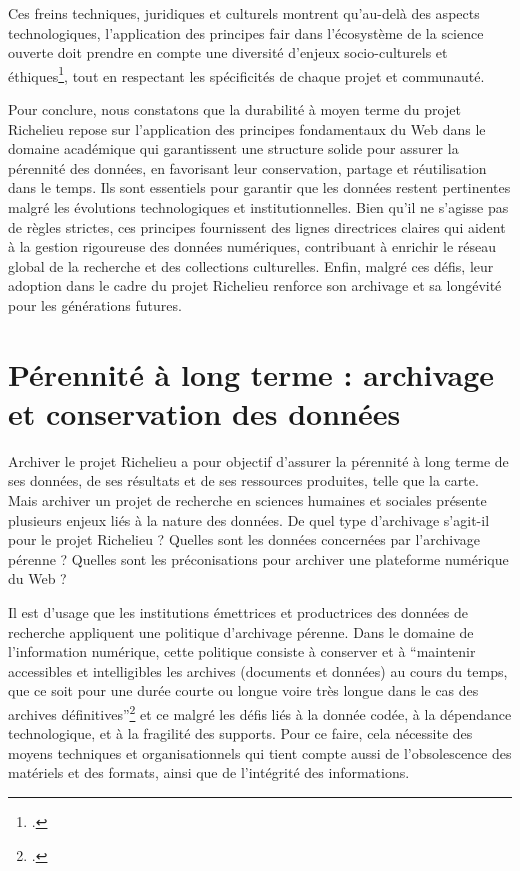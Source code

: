Ces freins techniques, juridiques et culturels montrent qu’au-delà des aspects technologiques, l’application des principes  \acrshort{fair} dans l'écosystème de la science ouverte doit prendre en compte une diversité d’enjeux socio-culturels et éthiques\footcite{WILKINSONInteroperability2017}, tout en respectant les spécificités de chaque projet et communauté.

Pour conclure, nous constatons que la durabilité à moyen terme du projet Richelieu repose sur l’application des principes fondamentaux du Web dans le domaine académique qui garantissent une structure solide pour assurer la pérennité des données, en favorisant leur conservation, partage et réutilisation dans le temps. Ils sont essentiels pour garantir que les données restent pertinentes malgré les évolutions technologiques et institutionnelles. Bien qu'il ne s'agisse pas de règles strictes, ces principes fournissent des lignes directrices claires qui aident à la gestion rigoureuse des données numériques, contribuant à enrichir le réseau global de la recherche et des collections culturelles.  Enfin, malgré ces défis, leur adoption dans le cadre du projet Richelieu renforce son archivage et sa longévité pour les générations futures.

\section{Pérennité à long terme : archivage et conservation des données}
Archiver le projet Richelieu a pour objectif d'assurer la pérennité à long terme de ses données, de ses résultats et de ses ressources produites, telle que la carte.  Mais archiver un projet de recherche en sciences humaines et sociales présente plusieurs enjeux liés à la nature des données. De quel type d'archivage s'agit-il pour le projet Richelieu ? Quelles sont les données concernées par l'archivage pérenne ? Quelles sont les préconisations pour archiver une plateforme numérique du Web ? 

Il est d'usage que les institutions émettrices et productrices des données de recherche appliquent une politique d'archivage pérenne. Dans le domaine de l'information numérique, cette politique consiste à conserver et à \enquote{maintenir accessibles et intelligibles les archives (documents et données) au cours du temps, que ce soit pour une durée courte ou longue voire très longue dans le cas des archives définitives}\footcite{FRANCEARCHIVESperennisation2023} et ce malgré les défis liés à la donnée codée, à la dépendance technologique, et à la fragilité des supports.  Pour ce faire, cela nécessite des moyens techniques et organisationnels qui tient compte aussi de l'obsolescence des matériels et des formats, ainsi que de l'intégrité des informations. 

